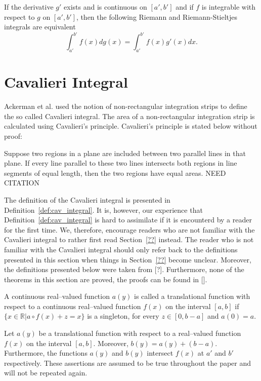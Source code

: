 \documentclass[twoside,reqno,11pt]{fcaa-var} %
\begin{document}
\begin{theorem}
If the derivative $g'$ exists and is continuous on $[a',b']$ and if $f$ is integrable with respect to $g$ on $[a',b']$, then the following 
Riemann and Riemann-Stieltjes integrals are equivalent
\begin{equation}
\int_{a'}^{b'} f(x) dg(x) = \int_{a'}^{b'} f(x)g'(x)dx.
\end{equation}
\end{theorem}
 
 
\section{Cavalieri Integral}
\label{sec:cav_integral}

Ackerman et al. used the notion of non-rectangular integration strips to define the so called Cavalieri integral. The area of a non-rectangular 
integration strip is calculated using Cavalieri's principle. Cavalieri's principle is stated below without proof:
\begin{theorem}
Suppose two regions in a plane are included between two parallel lines in that plane. If every line parallel to these
two lines intersects both regions in line segments of equal length, then the two regions have equal areas. NEED CITATION
\end{theorem}
The definition of the Cavalieri integral is presented in Definition~\ref{def:cav_integral}.
It is, however, our experience that Definition~\ref{def:cav_integral} is hard to assimilate if it is encounterd by a reader for the first time. We, therefore, encourage 
readers who are not familiar with the Cavalieri integral to rather first read Section~\ref{??} instead. The reader who is not familiar with the Cavalieri integral should only refer back to the definitions 
presented in this section when things in Section~\ref{??} become unclear. Moreover, the definitions presented below were taken from [?]. Furthermore, none of the theorems in this section are proved, the proofs can be found in [].

\begin{definition}\label{def:trans}
A continuous real--valued function $a(y)$ is called a translational function with respect to a continuous real--valued function $f(x)$ on the interval $[a,b]$ if 
$\{x\in\mathbb{R}|a\circ f(x) + z = x\}$ is a singleton, for every $z\in[0,b-a]$ and $a(0) = a$.
\end{definition}

Let $a(y)$ be a translational function with respect to a real--valued function $f(x)$ on the interval $[a,b]$. Moreover, $b(y) = a(y) + (b-a)$. Furthermore, the functions $a(y)$ and $b(y)$ intersect $f(x)$ at $a'$ and $b'$ respectively.
These assertions are assumed to be true throughout the paper and will not be repeated again.
\end{document}

